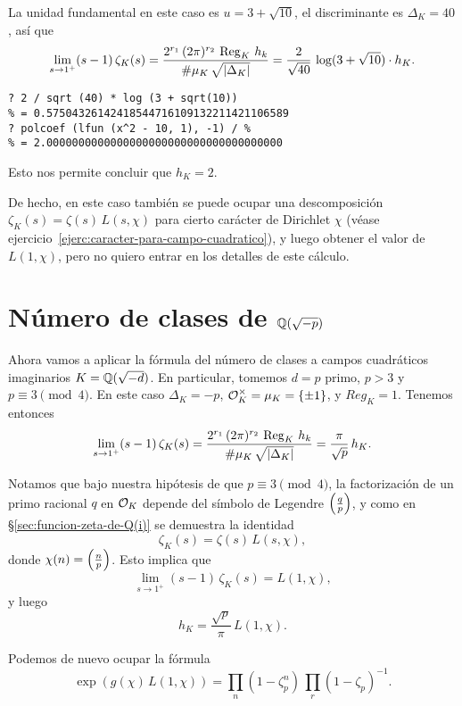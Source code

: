 La unidad fundamental en este caso es $u = 3 + \sqrt{10}$, el discriminante
es $\Delta_K = 40$, así que
\[ \lim_{s \to 1^+} (s - 1)\,\zeta_K (s) =
   \frac{2^{r_1}\,(2\pi)^{r_2}\,\operatorname{Reg}_K\,h_k}{\#\mu_K\,\sqrt{|\Delta_K|}} =
   \frac{2}{\sqrt{40}}\,\log (3 + \sqrt{10})\cdot h_K. \]
\begin{shaded}
\begin{verbatim}
? 2 / sqrt (40) * log (3 + sqrt(10))
% = 0.57504326142418544716109132211421106589
? polcoef (lfun (x^2 - 10, 1), -1) / %
% = 2.0000000000000000000000000000000000000
\end{verbatim}
\end{shaded}
Esto nos permite concluir que $h_K = 2$.

De hecho, en este caso también se puede ocupar una descomposición
$\zeta_K (s) = \zeta (s) \, L (s,\chi)$ para cierto carácter de Dirichlet $\chi$
(véase ejercicio~\ref{ejerc:caracter-para-campo-cuadratico}), y luego obtener
el valor de $L (1,\chi)$, pero no quiero entrar en los detalles de este cálculo.


\section{Número de clases de \texorpdfstring{$\mathbb{Q} (\sqrt{-p})$}{ℚ(√−p)}}

Ahora vamos a aplicar la fórmula del número de clases a campos cuadráticos
imaginarios $K = \mathbb{Q} (\sqrt{-d})$. En particular, tomemos $d = p$ primo, $p > 3$
y $p \equiv 3 \pmod{4}$. En este caso $\Delta_K = -p$, $\mathcal{O}_K^\times = \mu_K = \{ \pm 1 \}$,
y $Reg_K = 1$. Tenemos entonces
\[ \lim_{s \to 1^+} (s - 1)\,\zeta_K (s) =
   \frac{2^{r_1}\,(2\pi)^{r_2}\,\operatorname{Reg}_K\,h_k}{\#\mu_K\,\sqrt{|\Delta_K|}} =
   \frac{\pi}{\sqrt{p}}\,h_K. \]

Notamos que bajo nuestra hipótesis de que $p \equiv 3\pmod{4}$, la factorización
de un primo racional $q$ en $\mathcal{O}_K$ depende del símbolo de Legendre
$\left(\frac{q}{p}\right)$, y como en \S\ref{sec:funcion-zeta-de-Q(i)} se demuestra la
identidad
$$\zeta_K (s) = \zeta (s)\,L (s,\chi),$$
donde $\chi (n) = \left(\frac{n}{p}\right)$. Esto implica que
$$\lim_{s \to 1^+} (s - 1)\,\zeta_K (s) = L (1,\chi),$$
y luego
$$h_K = \frac{\sqrt{p}}{\pi}\,L (1,\chi).$$

Podemos de nuevo ocupar la fórmula
$$\exp (g (\chi)\,L(1,\chi)) = \prod_n (1 - \zeta_p^n)\,\prod_r (1 - \zeta_p)^{-1}.$$

